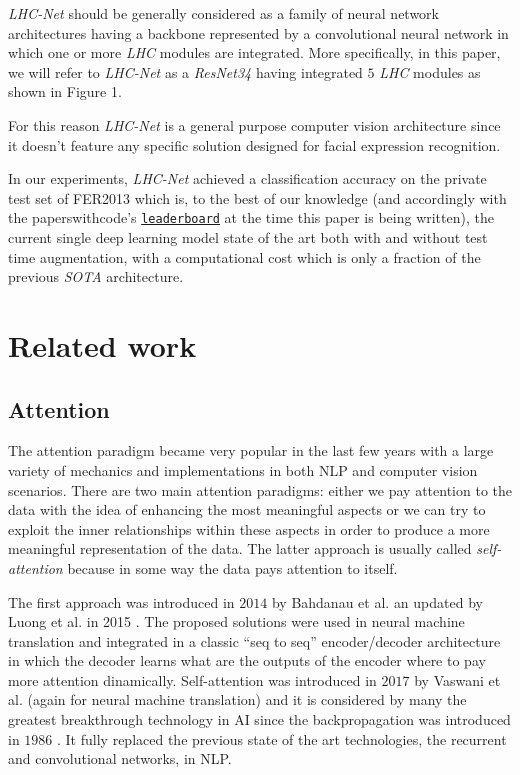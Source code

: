\documentclass[fleqn,10pt]{SelfArx}
\begin{document}
\textit{LHC-Net} should be generally considered as a family of neural network architectures having a backbone represented by a convolutional neural network in which one or more \textit{LHC} modules are integrated. More specifically, in this paper, we will refer to \textit{LHC-Net} as a \textit{ResNet34} \cite{resnet} having integrated $5$ \textit{LHC} modules as shown in Figure 1.

For this reason \textit{LHC-Net} is a general purpose computer vision architecture since it doesn't feature any specific solution designed for facial expression recognition. 

In our experiments, \textit{LHC-Net} achieved a classification accuracy on the private test set of FER2013 which is, to the best of our knowledge (and accordingly with the paperswithcode's \href{https://paperswithcode.com/sota/facial-expression-recognition-on-fer2013}{\texttt{leaderboard}} at the time this paper is being written), the current single deep learning model state of the art both with and without test time augmentation, with a computational cost which is only a fraction of the previous \textit{SOTA} architecture.\textit{}



\section{Related work}
\subsection{Attention}
The attention paradigm became very popular in the last few years with a large variety of mechanics and implementations in both NLP and computer vision scenarios. There are two main attention paradigms: either we pay attention to the data with the idea of enhancing the most meaningful aspects or we can try to exploit the inner relationships within these aspects in order to produce a more meaningful representation of the data. The latter approach is usually called \textit{self-attention} because in some way the data pays attention to itself. 

The first approach was introduced in $2014$ by Bahdanau et al. \cite{bahdanau2014neural} an updated by Luong et al. in 2015 \cite{luong2015effective}. The proposed solutions were used in neural machine translation and integrated in a classic ``seq to seq'' encoder/decoder architecture in which the decoder learns what are the outputs of the encoder where to pay more attention dinamically. 
Self-attention was introduced in $2017$ by Vaswani et al. \cite{Transformer} (again for neural machine translation) and it is considered by many the greatest breakthrough technology in AI since the backpropagation was introduced in $1986$ \cite{rumelhart1986learning}. It fully replaced the previous state of the art technologies, the recurrent and convolutional networks, in NLP.
\end{document}
